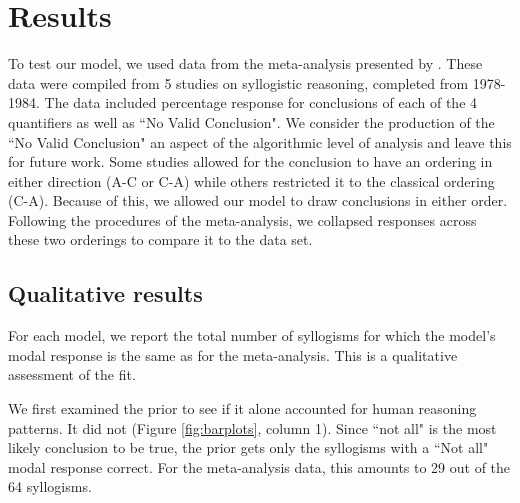 \documentclass[10pt,letterpaper]{article}
\begin{document}
\section{Results}

To test our model, we used data from the meta-analysis presented by . These data were compiled from 5 studies on syllogistic reasoning, completed from 1978-1984. The data included percentage response for conclusions of each of the 4 quantifiers as well as ``No Valid Conclusion". We consider the production of the ``No Valid Conclusion" an aspect of the algorithmic level of analysis and leave this for future work. Some studies allowed for the conclusion to have an ordering in either direction (A-C or C-A) while others restricted it to the classical ordering (C-A). Because of this, we allowed our model to draw conclusions in either order. Following the procedures of the meta-analysis, we collapsed responses across these two orderings to compare it to the data set.

\subsection{Qualitative results}
For each model, we report the total number of syllogisms for which the model's modal response is the same as for the meta-analysis. This is a qualitative assessment of the fit. 

We first examined the prior to see if it alone accounted for human reasoning patterns. It did not (Figure \ref{fig:barplots}, column 1). Since ``not all" is the most likely conclusion to be true, the prior gets only the syllogisms with a ``Not all" modal response correct. For the meta-analysis data, this amounts to 29 out of the 64 syllogisms.
\end{document}
